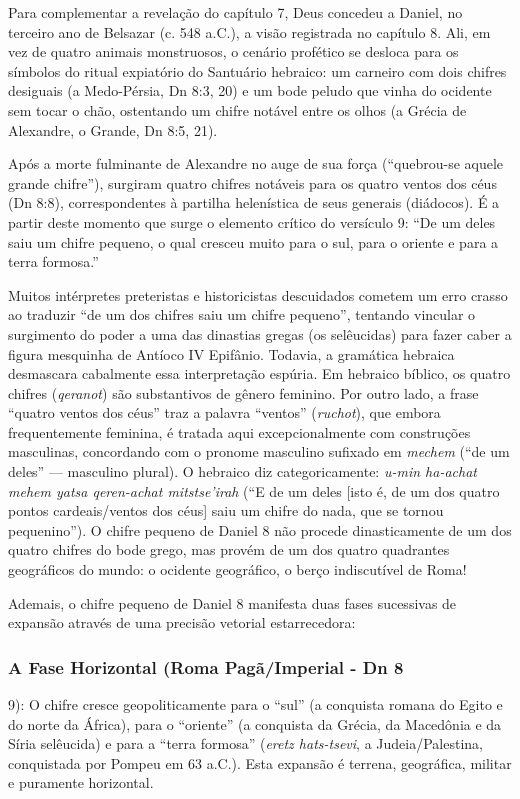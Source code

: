 Para complementar a revelação do capítulo 7, Deus concedeu a Daniel, no terceiro ano de Belsazar (c. 548 a.C.), a visão registrada no capítulo 8. Ali, em vez de quatro animais monstruosos, o cenário profético se desloca para os símbolos do ritual expiatório do Santuário hebraico: um carneiro com dois chifres desiguais (a Medo-Pérsia, Dn 8:3, 20) e um bode peludo que vinha do ocidente sem tocar o chão, ostentando um chifre notável entre os olhos (a Grécia de Alexandre, o Grande, Dn 8:5, 21).

Após a morte fulminante de Alexandre no auge de sua força (``quebrou-se aquele grande chifre''), surgiram quatro chifres notáveis para os quatro ventos dos céus (Dn 8:8), correspondentes à partilha helenística de seus generais (diádocos). É a partir deste momento que surge o elemento crítico do versículo 9: ``De um deles saiu um chifre pequeno, o qual cresceu muito para o sul, para o oriente e para a terra formosa.''

Muitos intérpretes preteristas e historicistas descuidados cometem um erro crasso ao traduzir ``de um dos chifres saiu um chifre pequeno'', tentando vincular o surgimento do poder a uma das dinastias gregas (os selêucidas) para fazer caber a figura mesquinha de Antíoco IV Epifânio. Todavia, a gramática hebraica desmascara cabalmente essa interpretação espúria. Em hebraico bíblico, os quatro chifres (\textit{qeranot}) são substantivos de gênero feminino. Por outro lado, a frase ``quatro ventos dos céus'' traz a palavra ``ventos'' (\textit{ruchot}), que embora frequentemente feminina, é tratada aqui excepcionalmente com construções masculinas, concordando com o pronome masculino sufixado em \textit{mechem} (``de um deles'' — masculino plural). O hebraico diz categoricamente: \textit{u-min ha-achat mehem yatsa qeren-achat mitstse'irah} (``E de um deles [isto é, de um dos quatro pontos cardeais/ventos dos céus] saiu um chifre do nada, que se tornou pequenino''). O chifre pequeno de Daniel 8 não procede dinasticamente de um dos quatro chifres do bode grego, mas provém de um dos quatro quadrantes geográficos do mundo: o ocidente geográfico, o berço indiscutível de Roma!

Ademais, o chifre pequeno de Daniel 8 manifesta duas fases sucessivas de expansão através de uma precisão vetorial estarrecedora:


\subsubsection*{A Fase Horizontal (Roma Pagã/Imperial - Dn 8}
9): O chifre cresce geopoliticamente para o ``sul'' (a conquista romana do Egito e do norte da África), para o ``oriente'' (a conquista da Grécia, da Macedônia e da Síria selêucida) e para a ``terra formosa'' (\textit{eretz hats-tsevi}, a Judeia/Palestina, conquistada por Pompeu em 63 a.C.). Esta expansão é terrena, geográfica, militar e puramente horizontal.


